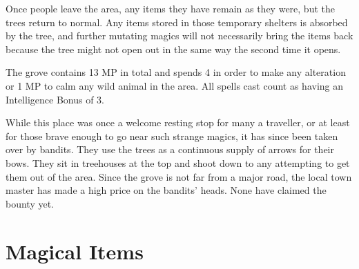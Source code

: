 \begin{multicols}{2}
Once people leave the area, any items they have remain as they were, but the trees return to normal.  Any items stored in those temporary shelters is absorbed by the tree, and further mutating magics will not necessarily bring the items back because the tree might not open out in the same way the second time it opens.

The grove contains 13 MP in total and spends 4 in order to make any alteration or 1 MP to calm any wild animal in the area.  All spells cast count as having an Intelligence Bonus of 3.

While this place was once a welcome resting stop for many a traveller, or at least for those brave enough to go near such strange magics, it has since been taken over by bandits.  They use the trees as a continuous supply of arrows for their bows.  They sit in treehouses at the top and shoot down to any attempting to get them out of the area.  Since the grove is not far from a major road, the local town master has made a high price on the bandits' heads.  None have claimed the bounty yet.

\end{multicols}

\section{Magical Items}

